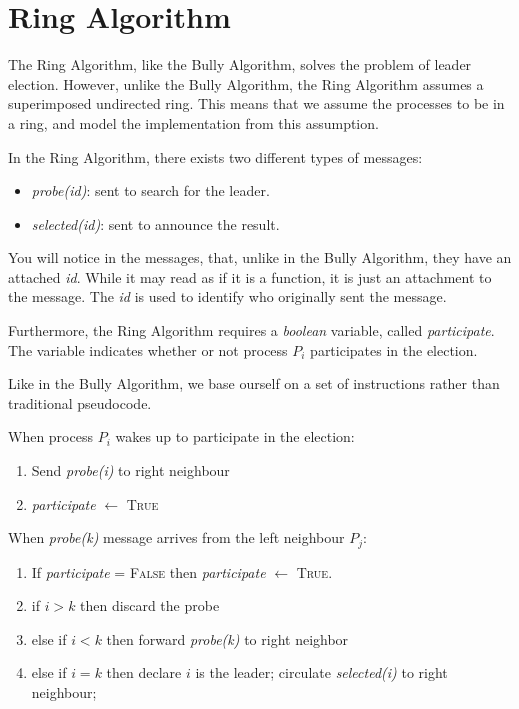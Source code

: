 \documentclass{report}
\begin{document}
\section{Ring Algorithm}

The Ring Algorithm, like the Bully Algorithm, solves the problem of leader election. However, unlike the Bully Algorithm, the Ring Algorithm assumes a superimposed undirected ring. This means that we assume the processes to be in a ring, and model the implementation from this assumption.

In the Ring Algorithm, there exists two different types of messages:
\begin{itemize}
  \item \textit{probe(id)}: sent to search for the leader.
  \item \textit{selected(id)}: sent to announce the result.
\end{itemize}

You will notice in the messages, that, unlike in the Bully Algorithm, they have an attached \textit{id}. While it may read as if it is a function, it is just an attachment to the message. The \textit{id} is used to identify who originally sent the message.

Furthermore, the Ring Algorithm requires a \textit{boolean} variable, called \textit{participate}. The variable indicates whether or not process $P_{i}$ participates in the election.

Like in the Bully Algorithm, we base ourself on a set of instructions rather than traditional pseudocode.

\noindent
When process $P_{i}$ wakes up to participate in the election:
\begin{enumerate}
  \item Send \textit{probe(i)} to right neighbour
        \item \textit{participate }$\leftarrow $ \textsc{True}
\end{enumerate}

\noindent
When \textit{probe(k)} message arrives from the left neighbour $P_{j}$:
\begin{enumerate}
  \item If \textit{participate} = \textsc{False} then \textit{participate} $\leftarrow$ \textsc{True}.
  \item if $i > k$ then discard the probe
  \item else if $i < k$ then forward \textit{probe(k)} to right neighbor
  \item else if $i = k$ then declare $i$ is the leader; circulate \textit{selected(i)} to right neighbour;
\end{enumerate}
\end{document}
